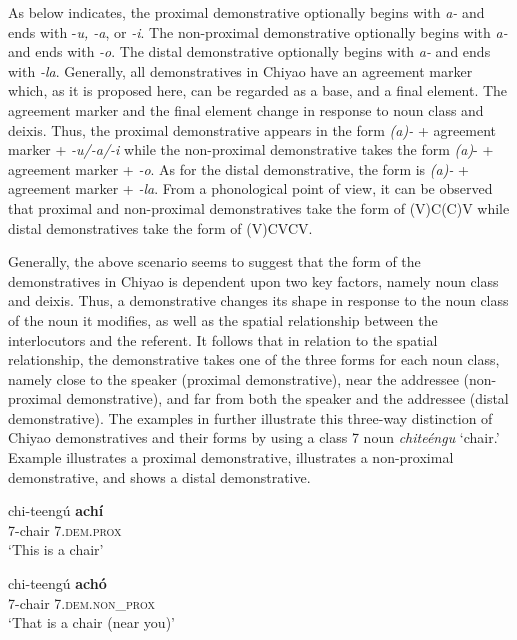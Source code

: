 \documentclass[output=paper,
            colorlinks, citecolor=brown
            ,draftmode
		  ]{langscibook}
\begin{document}
As  below indicates, the proximal demonstrative optionally begins with \textit{a-} and ends with -\textit{u, -a}, or \textit{{}-i}. The non-proximal demonstrative optionally begins with \textit{a-} and ends with \textit{{}-o}. The distal demonstrative optionally begins with \textit{a-} and ends with \textit{{}-la}. Generally, all demonstratives in Chiyao have an agreement marker which, as it is proposed here, can be regarded as a base, and a final element. The agreement marker and the final element change in response to noun class and deixis. Thus, the proximal demonstrative appears in the form \textit{(a)-} + agreement marker + \textit{{}-u/-a/-i} while the non-proximal demonstrative takes the form \textit{(a)}{}- + agreement marker + \textit{{}-o}. As for the distal demonstrative, the form is \textit{(a)-} + agreement marker + \textit{{}-la}. From a phonological point of view, it can be observed that proximal and non-proximal demonstratives take the form of (V)C(C)V while distal demonstratives take the form of (V)CVCV.

Generally, the above scenario seems to suggest that the form of the demonstratives in Chiyao is dependent upon two key factors, namely noun class and deixis. Thus, a demonstrative changes its shape in response to the noun class of the noun it modifies, as well as the spatial relationship between the interlocutors and the referent. It follows that in relation to the spatial relationship, the demonstrative takes one of the three forms for each noun class, namely close to the speaker (proximal demonstrative), near the addressee (non-proximal demonstrative), and far from both the speaker and the addressee (distal demonstrative). The examples in  further illustrate this three-way distinction of Chiyao demonstratives and their forms by using a class 7 noun \textit{chiteéngu} ‘chair.’ Example  illustrates a proximal demonstrative,  illustrates a non-proximal demonstrative, and  shows a distal demonstrative.

\ea%
    \label{ex:taji:7}
    \ea\label{ex:taji:7a} \gll  chi-teengú  \textbf{achí} \\
      7-chair        7.\textsc{dem.prox}\\            
      \glt ‘This is a chair’          

    \ex\label{ex:taji:7b} \gll  chi-teengú    \textbf{achó}\\
      7-chair          7.\textsc{dem.non\_prox}\\
      \glt ‘That is a chair (near you)’
\end{document}
